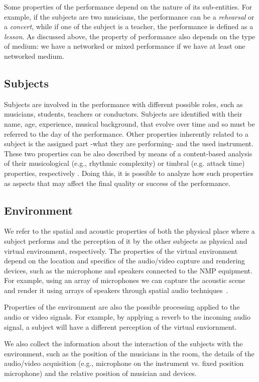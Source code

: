 \documentclass[conference]{IEEEtran}
\begin{document}
Some properties of the performance depend on the nature of its sub-entities. For example, if the subjects are two musicians, the performance can be a \textit{rehearsal} or a \textit{concert}, while if one of the subject is a teacher, the performance is defined as a \textit{lesson}. As discussed above, the property of performance also depends on the type of medium: we have a networked or mixed performance if we have at least one networked medium.   

\subsection{Subjects}
Subjects are involved in the performance with different possible roles, such as musicians, students, teachers or conductors. Subjects are identified with their name, age, experience, musical background, that evolve over time and so must be referred to the day of the performance. Other properties inherently related to a subject is the assigned part -what they are performing- and the used instrument. These two properties can be also described by means of a content-based analysis of their musicological (e.g., rhythmic complexity) or timbral (e.g. attack time) properties, respectively \cite{RottondiFeature}.
Doing this, it is possible to analyze how such properties as aspects that may affect the final quality or success of the performance.


\subsection{Environment}
We refer to the spatial and acoustic properties of both the physical place where a subject performs and the perception of it by the other subjects as physical and virtual environment, respectively. The properties of the virtual environment depend on the location and specifics of the audio/video capture and rendering devices, such as the microphone and speakers connected to the NMP equipment. For example, using an array of microphones we can capture the acoustic scene~\cite{Markovic2013} and render it using arrays of speakers through spatial audio techniques~\cite{bianchi2016}.

Properties of the environment are also the possible processing applied to the audio or video signals. For example, by applying a reverb to the incoming audio signal, a subject will have a different perception of the virtual enviornment.

We also collect the information about the interaction of the subjects with the environment, such as the position of the musicians in the room, the details of the audio/video acquisition (e.g., microphone on the instrument vs. fixed position microphone) and the relative position of musician and devices. 
\end{document}
